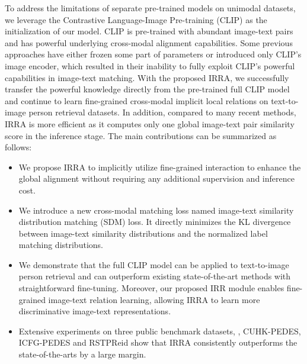 \documentclass[10pt,twocolumn,letterpaper]{article}
\begin{document}
To address the limitations of separate pre-trained models on unimodal datasets, we leverage the Contrastive Language-Image Pre-training (CLIP)\cite{radford2021learning} as the initialization of our model. CLIP is pre-trained with abundant image-text pairs and has powerful underlying cross-modal alignment capabilities.
Some previous approaches\cite{han2021text,yan2022clip} have either frozen some part of parameters or introduced only CLIP's image encoder, which resulted in their inability to fully exploit CLIP's powerful capabilities in image-text matching. With the proposed IRRA, we successfully transfer the powerful knowledge directly from the pre-trained full CLIP model and continue to learn fine-grained cross-modal implicit local relations on text-to-image person retrieval datasets. In addition, compared to many recent methods\cite{chen2022tipcb,yan2022clip,shao2022learning}, IRRA is more efficient as it computes only one global image-text pair similarity score in the inference stage.
The main contributions can be summarized as follows:
\begin{itemize}
  
  \item We propose IRRA to implicitly utilize fine-grained interaction to enhance the global alignment without requiring any additional supervision and inference cost.
  
  \item We introduce a new cross-modal matching loss named image-text similarity distribution matching (SDM) loss. It directly minimizes the KL divergence between image-text similarity distributions and the normalized label matching distributions.
  
  \item We demonstrate that the full CLIP model can be applied to text-to-image person retrieval and can outperform existing state-of-the-art methods with straightforward fine-tuning. Moreover, our proposed IRR module enables fine-grained image-text relation learning, allowing IRRA to learn more discriminative image-text representations.
  
  \item Extensive experiments on three public benchmark datasets, \ie, CUHK-PEDES\cite{li2017person}, ICFG-PEDES\cite{ding2021semantically} and RSTPReid\cite{zhu2021dssl} show that IRRA consistently outperforms the state-of-the-arts by a large margin.

\end{itemize}
\end{document}
